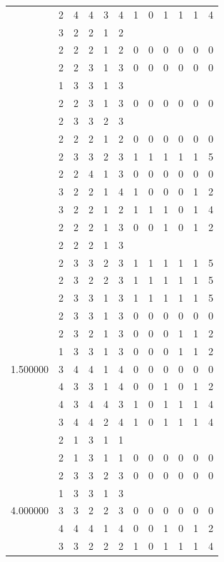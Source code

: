 \documentclass[]{book}
\theoremstyle{definition}
\theoremstyle{definition}
\theoremstyle{definition}
\theoremstyle{remark}
\begin{document}
\begin{table}
{\begin{tabular}[t]{rrrrrrrrrrrr}
 & 2 & 4 & 4 & 3 & 4 & 1 & 0 & 1 & 1 & 1 & 4\\
 & 3 & 2 & 2 & 1 & 2 &  &  &  &  &  & \\
 & 2 & 2 & 2 & 1 & 2 & 0 & 0 & 0 & 0 & 0 & 0\\
 & 2 & 2 & 3 & 1 & 3 & 0 & 0 & 0 & 0 & 0 & 0\\
 & 1 & 3 & 3 & 1 & 3 &  &  &  &  &  & \\
 & 2 & 2 & 3 & 1 & 3 & 0 & 0 & 0 & 0 & 0 & 0\\
 & 2 & 3 & 3 & 2 & 3 &  &  &  &  &  & \\
 & 2 & 2 & 2 & 1 & 2 & 0 & 0 & 0 & 0 & 0 & 0\\
 & 2 & 3 & 3 & 2 & 3 & 1 & 1 & 1 & 1 & 1 & 5\\
 & 2 & 2 & 4 & 1 & 3 & 0 & 0 & 0 & 0 & 0 & 0\\
 & 3 & 2 & 2 & 1 & 4 & 1 & 0 & 0 & 0 & 1 & 2\\
 & 3 & 2 & 2 & 1 & 2 & 1 & 1 & 1 & 0 & 1 & 4\\
 & 2 & 2 & 2 & 1 & 3 & 0 & 0 & 1 & 0 & 1 & 2\\
 & 2 & 2 & 2 & 1 & 3 &  &  &  &  &  & \\
 & 2 & 3 & 3 & 2 & 3 & 1 & 1 & 1 & 1 & 1 & 5\\
 & 2 & 3 & 2 & 2 & 3 & 1 & 1 & 1 & 1 & 1 & 5\\
 & 2 & 3 & 3 & 1 & 3 & 1 & 1 & 1 & 1 & 1 & 5\\
 & 2 & 3 & 3 & 1 & 3 & 0 & 0 & 0 & 0 & 0 & 0\\
 & 2 & 3 & 2 & 1 & 3 & 0 & 0 & 0 & 1 & 1 & 2\\
 & 1 & 3 & 3 & 1 & 3 & 0 & 0 & 0 & 1 & 1 & 2\\
1.500000 & 3 & 4 & 4 & 1 & 4 & 0 & 0 & 0 & 0 & 0 & 0\\
 & 4 & 3 & 3 & 1 & 4 & 0 & 0 & 1 & 0 & 1 & 2\\
 & 4 & 3 & 4 & 4 & 3 & 1 & 0 & 1 & 1 & 1 & 4\\
 & 3 & 4 & 4 & 2 & 4 & 1 & 0 & 1 & 1 & 1 & 4\\
 & 2 & 1 & 3 & 1 & 1 &  &  &  &  &  & \\
 & 2 & 1 & 3 & 1 & 1 & 0 & 0 & 0 & 0 & 0 & 0\\
 & 2 & 3 & 3 & 2 & 3 & 0 & 0 & 0 & 0 & 0 & 0\\
 & 1 & 3 & 3 & 1 & 3 &  &  &  &  &  & \\
4.000000 & 3 & 3 & 2 & 2 & 3 & 0 & 0 & 0 & 0 & 0 & 0\\
 & 4 & 4 & 4 & 1 & 4 & 0 & 0 & 1 & 0 & 1 & 2\\
 & 3 & 3 & 2 & 2 & 2 & 1 & 0 & 1 & 1 & 1 & 4\\

\end{tabular}}
\end{table}
\end{document}
